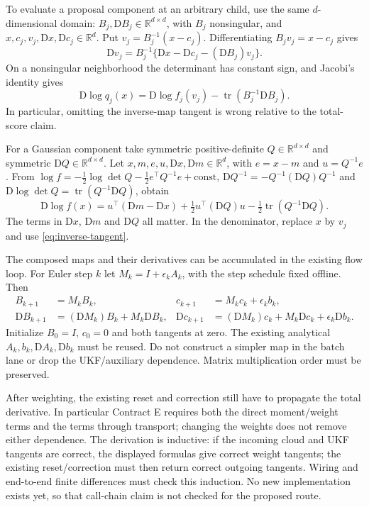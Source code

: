 \documentclass[11pt]{article}
\newcommand{\D}{\mathrm D}
\newcommand{\tr}{\operatorname{tr}}
\begin{document}
To evaluate a proposal component at an arbitrary child, use the same
$d$-dimensional domain: $B_j,\D B_j\in\mathbb R^{d\times d}$, with
$B_j$ nonsingular, and $x,c_j,v_j,\D x,\D c_j\in\mathbb R^d$. Put
$v_j=B_j^{-1}(x-c_j)$. Differentiating $B_jv_j=x-c_j$ gives
\begin{equation}
 \D v_j=B_j^{-1}\{\D x-\D c_j-(\D B_j)v_j\}.
 \label{eq:inverse-tangent}
\end{equation}
On a nonsingular neighborhood the determinant has constant sign, and
Jacobi's identity gives
\begin{equation}
 \D\log q_j(x)=\D\log f_j(v_j)
                      -\tr(B_j^{-1}\D B_j).
 \label{eq:proposal-score}
\end{equation}
In particular, omitting the inverse-map tangent is wrong relative to the
total-score claim.

For a Gaussian component take symmetric positive-definite
$Q\in\mathbb R^{d\times d}$ and symmetric $\D Q\in\mathbb R^{d\times d}$.
Let $x,m,e,u,\D x,\D m\in\mathbb R^d$, with $e=x-m$ and $u=Q^{-1}e$.
From $\log f=-\tfrac12\log\det Q-\tfrac12 e^\top Q^{-1}e+\mathrm{const}$,
$\D Q^{-1}=-Q^{-1}(\D Q)Q^{-1}$ and
$\D\log\det Q=\tr(Q^{-1}\D Q)$, obtain
\begin{equation}
 \D\log f(x)
 =u^\top(\D m-\D x)
  +\tfrac12u^\top(\D Q)u-\tfrac12\tr(Q^{-1}\D Q).
 \label{eq:gaussian-score}
\end{equation}
The terms in $\D x$, $\D m$ and $\D Q$ all matter. In the denominator,
replace $x$ by $v_j$ and use \eqref{eq:inverse-tangent}.

The composed maps and their derivatives can be accumulated in the existing
flow loop. For Euler step $k$ let $M_k=I+\epsilon_k A_k$, with the step
schedule fixed offline. Then
\begin{align}
 B_{k+1}&=M_k B_k,& c_{k+1}&=M_k c_k+\epsilon_k b_k,
 \label{eq:map-composition}\\
 \D B_{k+1}&=(\D M_k)B_k+M_k\D B_k,&
 \D c_{k+1}&=(\D M_k)c_k+M_k\D c_k+\epsilon_k\D b_k .
 \label{eq:map-tangent}
\end{align}
Initialize $B_0=I$, $c_0=0$ and both tangents at zero.
The existing analytical $A_k,b_k,\D A_k,\D b_k$ must be reused.
Do not construct a simpler map in the batch lane or drop the UKF/auxiliary
dependence. Matrix multiplication order must be preserved.

After weighting, the existing reset and correction still have to propagate
the total derivative. In particular Contract E requires both the direct
moment/weight terms and the terms through transport; changing the weights
does not remove either dependence. The derivation is inductive: if the
incoming cloud and UKF tangents are correct, the displayed formulas give
correct weight tangents; the existing reset/correction must then return
correct outgoing tangents. Wiring and end-to-end finite differences must
check this induction. No new implementation exists yet, so that call-chain
claim is not checked for the proposed route.
\end{document}
